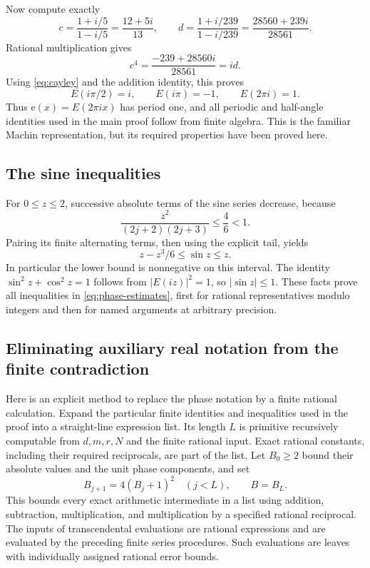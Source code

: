 \documentclass[11pt]{article}
\theoremstyle{definition}\newtheorem{definition}[theorem]{Definition}
\theoremstyle{remark}\newtheorem{remark}[theorem]{Remark}
\newcommand{\e}{\mathrm e}\newcommand{\PR}{\mathrm{PR}}
\begin{document}
Now compute exactly
\[
 c=\frac{1+i/5}{1-i/5}=\frac{12+5i}{13},\qquad
 d=\frac{1+i/239}{1-i/239}=\frac{28560+239i}{28561}.
\]
Rational multiplication gives
\[
 c^4=\frac{-239+28560i}{28561}=id.
\]
Using \eqref{eq:cayley} and the addition identity, this proves
\[
 E(i\pi/2)=i,\qquad E(i\pi)=-1,\qquad E(2\pi i)=1.
\]
Thus $\e(x)=E(2\pi ix)$ has period one, and all periodic and half-angle identities used in the main proof follow from finite algebra. This is the familiar Machin representation, but its required properties have been proved here.

\subsection{The sine inequalities}

For $0\le z\le2$, successive absolute terms of the sine series decrease, because
\[
 \frac{z^2}{(2j+2)(2j+3)}\le\frac46<1.
\]
Pairing its finite alternating terms, then using the explicit tail, yields
\[
 z-z^3/6\le\sin z\le z.
\]
In particular the lower bound is nonnegative on this interval. The identity $\sin^2z+\cos^2z=1$ follows from $|E(iz)|^2=1$, so $|\sin z|\le1$. These facts prove all inequalities in \eqref{eq:phase-estimates}, first for rational representatives modulo integers and then for named arguments at arbitrary precision.

\subsection{Eliminating auxiliary real notation from the finite contradiction}

Here is an explicit method to replace the phase notation by a finite rational calculation. Expand the particular finite identities and inequalities used in the proof into a straight-line expression list. Its length $L$ is primitive recursively computable from $d,m,r,N$ and the finite rational input. Exact rational constants, including their required reciprocals, are part of the list. Let $B_0\ge2$ bound their absolute values and the unit phase components, and set
\[
 B_{j+1}=4(B_j+1)^2\quad(j<L),\qquad B=B_L.
\]
This bounds every exact arithmetic intermediate in a list using addition, subtraction, multiplication, and multiplication by a specified rational reciprocal. The inputs of transcendental evaluations are rational expressions and are evaluated by the preceding finite series procedures. Such evaluations are leaves with individually assigned rational error bounds.
\end{document}
